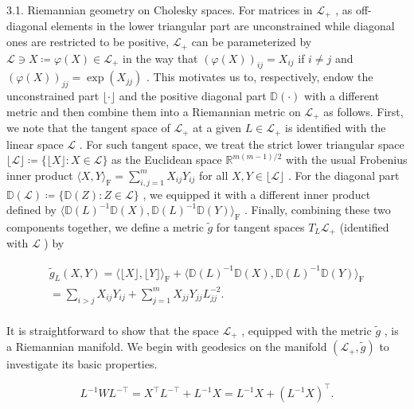 \documentclass[11pt]{article}
\begin{document}
3.1. Riemannian geometry on Cholesky spaces. For matrices in  $\mathcal{L}_{+}$ , as off-diagonal elements in the lower triangular part are unconstrained while diagonal ones are restricted to be positive,  $\mathcal{L}_{+}$  can be parameterized by  $\mathcal{L} \ni X \coloneqq \varphi(X) \in \mathcal{L}_{+}$  in the way that  $(\varphi(X))_{ij} = X_{ij}$  if  $i \neq j$  and  $(\varphi(X))_{jj} = \exp(X_{jj})$ . This motivates us to, respectively, endow the unconstrained part  $\lfloor \cdot \rfloor$  and the positive diagonal part  $\mathbb{D}(\cdot)$  with a different metric and then combine them into a Riemannian metric on  $\mathcal{L}_{+}$  as follows. First, we note that the tangent space of  $\mathcal{L}_{+}$  at a given  $L \in \mathcal{L}_{+}$  is identified with the linear space  $\mathcal{L}$ . For such tangent space, we treat the strict lower triangular space  $\lfloor \mathcal{L} \rfloor \coloneqq \{\lfloor X \rfloor : X \in \mathcal{L}\}$  as the Euclidean space  $\mathbb{R}^{m(m-1)/2}$  with the usual Frobenius inner product  $\langle X, Y \rangle_{\mathrm{F}} = \sum_{i,j=1}^{m} X_{ij} Y_{ij}$  for all  $X, Y \in \lfloor \mathcal{L} \rfloor$ . For the diagonal part  $\mathbb{D}(\mathcal{L}) \coloneqq \{\mathbb{D}(Z) : Z \in \mathcal{L}\}$ , we equipped it with a different inner product defined by  $\langle \mathbb{D}(L)^{-1} \mathbb{D}(X), \mathbb{D}(L)^{-1} \mathbb{D}(Y) \rangle_{\mathrm{F}}$ . Finally, combining these two components together, we define a metric  $\tilde{g}$  for tangent spaces  $T_L \mathcal{L}_{+}$  (identified with  $\mathcal{L}$ ) by

$$
\begin{array}{l} \tilde {g} _ {L} (X, Y) = \langle \lfloor X \rfloor , \lfloor Y \rfloor \rangle_ {\mathrm {F}} + \langle \mathbb {D} (L) ^ {- 1} \mathbb {D} (X), \mathbb {D} (L) ^ {- 1} \mathbb {D} (Y) \rangle_ {\mathrm {F}} \\ = \sum_ {i > j} X _ {i j} Y _ {i j} + \sum_ {j = 1} ^ {m} X _ {j j} Y _ {j j} L _ {j j} ^ {- 2}. \\ \end{array}
$$

It is straightforward to show that the space  $\mathcal{L}_{+}$ , equipped with the metric  $\tilde{g}$ , is a Riemannian manifold. We begin with geodesics on the manifold  $(\mathcal{L}_{+},\tilde{g})$  to investigate its basic properties.

$$
L ^ {- 1} W L ^ {- \top} = X ^ {\top} L ^ {- \top} + L ^ {- 1} X = L ^ {- 1} X + (L ^ {- 1} X) ^ {\top}.
$$
\end{document}

